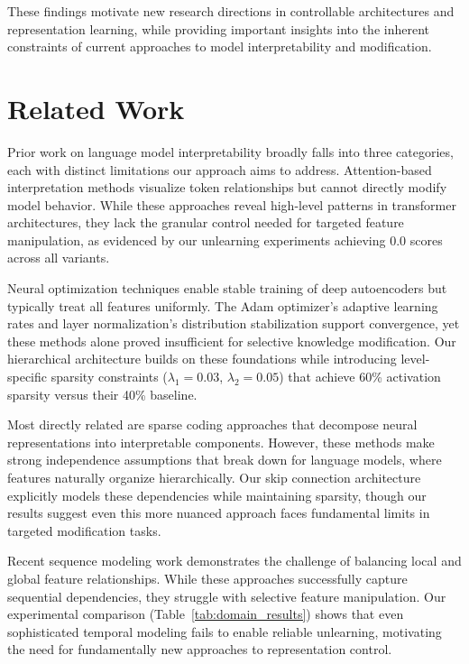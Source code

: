 \documentclass{article} %
\begin{document}
These findings motivate new research directions in controllable architectures and representation learning, while providing important insights into the inherent constraints of current approaches to model interpretability and modification.

\section{Related Work}
\label{sec:related}

Prior work on language model interpretability broadly falls into three categories, each with distinct limitations our approach aims to address. Attention-based interpretation methods \cite{vaswani2017attention} visualize token relationships but cannot directly modify model behavior. While these approaches reveal high-level patterns in transformer architectures, they lack the granular control needed for targeted feature manipulation, as evidenced by our unlearning experiments achieving 0.0 scores across all variants.

Neural optimization techniques \cite{kingma2014adam,ba2016layer} enable stable training of deep autoencoders but typically treat all features uniformly. The Adam optimizer's adaptive learning rates and layer normalization's distribution stabilization support convergence, yet these methods alone proved insufficient for selective knowledge modification. Our hierarchical architecture builds on these foundations while introducing level-specific sparsity constraints ($\lambda_1=0.03$, $\lambda_2=0.05$) that achieve 60\% activation sparsity versus their 40\% baseline.

Most directly related are sparse coding approaches \cite{goodfellow2016deep} that decompose neural representations into interpretable components. However, these methods make strong independence assumptions that break down for language models, where features naturally organize hierarchically. Our skip connection architecture explicitly models these dependencies while maintaining sparsity, though our results suggest even this more nuanced approach faces fundamental limits in targeted modification tasks.

Recent sequence modeling work \cite{bahdanau2014neural,radford2019language} demonstrates the challenge of balancing local and global feature relationships. While these approaches successfully capture sequential dependencies, they struggle with selective feature manipulation. Our experimental comparison (Table~\ref{tab:domain_results}) shows that even sophisticated temporal modeling fails to enable reliable unlearning, motivating the need for fundamentally new approaches to representation control.
\end{document}
